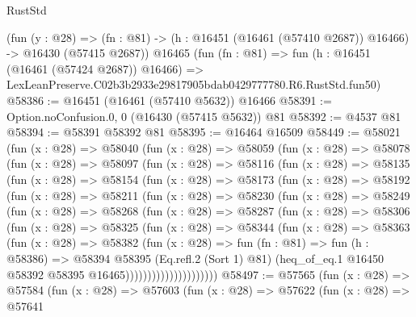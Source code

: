 \begin{lexlean}{RustStd}
\begin{coremodule}
    (fun (y : @28) =>
    (fn : @81) -> (h : @16451 (@16461 (@57410 @2687)) @16466) -> @16430 (@57415 @2687))
    @16465
    (fun (fn : @81) =>
    fun (h : @16451 (@16461 (@57424 @2687)) @16466) =>
    LexLeanPreserve.C02b3b2933e29817905bdab0429777780.R6.RustStd.fun50)
@58386 := @16451 (@16461 (@57410 @5632)) @16466
@58391 := Option.noConfusion.{0, 0} (@16430 (@57415 @5632)) @81
@58392 := @4537 @81
@58394 := @58391 @58392 @81
@58395 := @16464 @16509
@58449 := @58021
    (fun (x : @28) =>
    @58040
      (fun (x : @28) =>
      @58059
        (fun (x : @28) =>
        @58078
          (fun (x : @28) =>
          @58097
            (fun (x : @28) =>
            @58116
              (fun (x : @28) =>
              @58135
                (fun (x : @28) =>
                @58154
                  (fun (x : @28) =>
                  @58173
                    (fun (x : @28) =>
                    @58192
                      (fun (x : @28) =>
                      @58211
                        (fun (x : @28) =>
                        @58230
                          (fun (x : @28) =>
                          @58249
                            (fun (x : @28) =>
                            @58268
                              (fun (x : @28) =>
                              @58287
                                (fun (x : @28) =>
                                @58306
                                  (fun (x : @28) =>
                                  @58325
                                    (fun (x : @28) =>
                                    @58344
                                      (fun (x : @28) =>
                                      @58363
                                        (fun (x : @28) =>
                                        @58382
                                          (fun (x : @28) =>
                                          fun (fn : @81) =>
                                          fun (h : @58386) =>
                                          @58394
                                            @58395
                                            (Eq.refl.{2} (Sort 1) @81)
                                            (heq_of_eq.{1}
                                              @16450
                                              @58392
                                              @58395
                                              @16465)))))))))))))))))))))
@58497 := @57565
    (fun (x : @28) =>
    @57584
      (fun (x : @28) =>
      @57603
        (fun (x : @28) =>
        @57622
          (fun (x : @28) =>
          @57641

\end{coremodule}
\end{lexlean}
